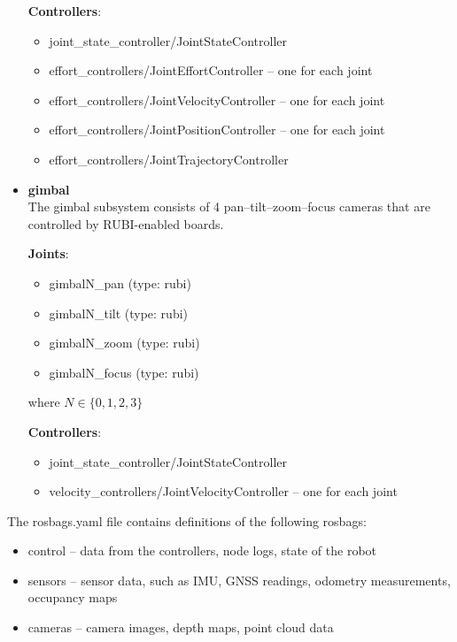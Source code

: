 \documentclass[english,inz,shortabstract]{iithesis}
\newcommand{\val}[1]{\textbf{\textsf{#1}}}
\begin{document}
\begin{itemize}
		\textbf{Controllers}:
		\begin{itemize}[itemsep=0pt, parsep=2pt, topsep=0pt]
			\item \textsf{joint\_state\_controller/JointStateController}
			\item \textsf{effort\_controllers/JointEffortController} -- one for each joint
			\item \textsf{effort\_controllers/JointVelocityController} -- one for each joint 
			\item \textsf{effort\_controllers/JointPositionController} -- one for each joint
			\item \textsf{effort\_controllers/JointTrajectoryController}
		\end{itemize}

		\item \val{gimbal}\\
		The \textsf{gimbal} subsystem consists of 4 pan--tilt--zoom--focus cameras that are controlled by RUBI-enabled boards. 

		\textbf{Joints}:
		\begin{itemize}[itemsep=0pt, parsep=2pt, topsep=0pt]
			\item \textsf{gimbalN\_pan} (type: \textsf{rubi})
			\item \textsf{gimbalN\_tilt} (type: \textsf{rubi})
			\item \textsf{gimbalN\_zoom} (type: \textsf{rubi})
			\item \textsf{gimbalN\_focus} (type: \textsf{rubi})
		\end{itemize}
		where $N \in \{0,1,2,3\}$

		\textbf{Controllers}:
		\begin{itemize}[itemsep=0pt, parsep=2pt, topsep=0pt]
			\item \textsf{joint\_state\_controller/JointStateController}
			\item \textsf{velocity\_controllers/JointVelocityController} -- one for each joint
		\end{itemize}
	\end{itemize}

	The \textsf{rosbags.yaml} file contains definitions of the following rosbags:
	\begin{itemize}[itemsep=0pt, parsep=2pt, topsep=0pt]
		\item \textsf{control} -- data from the controllers, node logs, state of the robot
		\item \textsf{sensors} -- sensor data, such as IMU, GNSS readings, odometry measurements, occupancy maps
		\item \textsf{cameras} -- camera images, depth maps, point cloud data
	\end{itemize}
\end{document}
